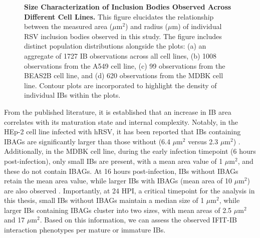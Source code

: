 \begin{figure}
\begin{subfigure}{0.495\textwidth}
    \end{subfigure}
    \caption[Size Characterization of Inclusion Bodies Observed Across Different Cell Lines.]{\textbf{Size Characterization of Inclusion Bodies Observed Across Different Cell Lines.} This figure elucidates the relationship between the measured area (\(\mu \mbox{m}^2\)) and radius (\(\mu \mbox{m}\)) of individual RSV inclusion bodies observed in this study. The figure includes distinct population distributions alongside the plots: (a) an aggregate of 1727 IB observations across all cell lines, (b) 1008 observations from the A549 cell line, (c) 99 observations from the BEAS2B cell line, and (d) 620 observations from the MDBK cell line. Contour plots are incorporated to highlight the density of individual IBs within the plots.}
    \label{fig:Size Characterization of Inclusion Bodies Observed Across Different Cell Lines}  
\end{figure}

From the published literature, it is established that an increase in IB area correlates with its maturation state and internal complexity. Notably, in the HEp-2 cell line infected with hRSV, it has been reported that IBs containing IBAGs are significantly larger than those without (6.4 \(\mu \mbox{m}^2\) versus 2.3 \(\mu \mbox{m}^2\)) \cite{Rincheval2017FunctionalVirus}. Additionally, in the MDBK cell line, during the early infection timepoint (6 hours post-infection), only small IBs are present, with a mean area value of 1 \(\mu \mbox{m}^2\), and these do not contain IBAGs. At 16 hours post-infection, IBs without IBAGs retain the mean area value, while larger IBs with IBAGs (mean area of 10 \(\mu \mbox{m}^2\)) are also observed \cite{Jobe2021BovineResponses}. Importantly, at 24 HPI, a critical timepoint for the analysis in this thesis, small IBs without IBAGs maintain a median size of 1 \(\mu \mbox{m}^2\), while larger IBs containing IBAGs cluster into two sizes, with mean areas of 2.5 \(\mu \mbox{m}^2\) and 17 \(\mu \mbox{m}^2\). Based on this information, we can assess the observed IFIT-IB interaction phenotypes per mature or immature IBs.

